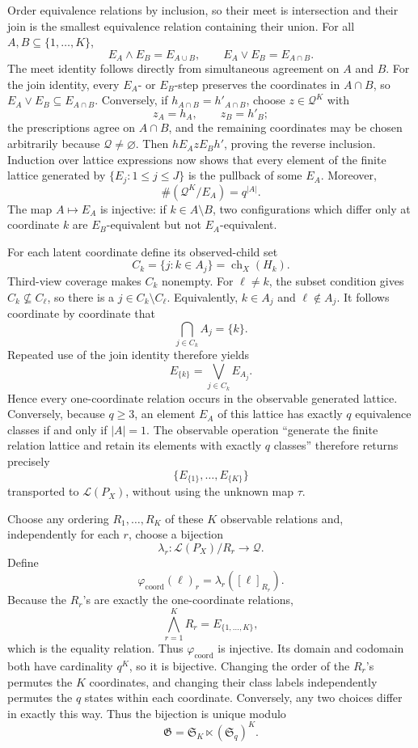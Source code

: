 Order equivalence relations by inclusion, so their meet is intersection and their join is the smallest equivalence relation containing their union.  For all \(A,B\subseteq\{1,\ldots,K\}\),
\[
 E_A\wedge E_B=E_{A\cup B},
 \qquad
 E_A\vee E_B=E_{A\cap B}.
\]
The meet identity follows directly from simultaneous agreement on \(A\) and \(B\).  For the join identity, every \(E_A\)- or \(E_B\)-step preserves the coordinates in \(A\cap B\), so \(E_A\vee E_B\subseteq E_{A\cap B}\).  Conversely, if \(h_{A\cap B}=h'_{A\cap B}\), choose \(z\in\mathcal Q^K\) with
\[
 z_A=h_A,
 \qquad z_B=h'_B;
\]
the prescriptions agree on \(A\cap B\), and the remaining coordinates may be chosen arbitrarily because \(\mathcal Q\ne\varnothing\).  Then \(h\mathrel{E_A}z\mathrel{E_B}h'\), proving the reverse inclusion.  Induction over lattice expressions now shows that every element of the finite lattice generated by \(\{E_j:1\le j\le J\}\) is the pullback of some \(E_A\).  Moreover,
\[
 \#(\mathcal Q^K/E_A)=q^{|A|}.
\]
The map \(A\mapsto E_A\) is injective: if \(k\in A\setminus B\), two configurations which differ only at coordinate \(k\) are \(E_B\)-equivalent but not \(E_A\)-equivalent.

For each latent coordinate define its observed-child set
\[
 C_k=\{j:k\in A_j\}=\operatorname{ch}_X(H_k).
\]
Third-view coverage makes \(C_k\) nonempty.  For \(\ell\ne k\), the subset condition gives \(C_k\nsubseteq C_\ell\), so there is a \(j\in C_k\setminus C_\ell\).  Equivalently, \(k\in A_j\) and \(\ell\notin A_j\).  It follows coordinate by coordinate that
\[
 \bigcap_{j\in C_k}A_j=\{k\}.
\]
Repeated use of the join identity therefore yields
\[
 E_{\{k\}}=\bigvee_{j\in C_k}E_{A_j}.
\]
Hence every one-coordinate relation occurs in the observable generated lattice.  Conversely, because \(q\ge3\), an element \(E_A\) of this lattice has exactly \(q\) equivalence classes if and only if \(|A|=1\).  The observable operation ``generate the finite relation lattice and retain its elements with exactly \(q\) classes'' therefore returns precisely
\[
 \{E_{\{1\}},\ldots,E_{\{K\}}\}
\]
transported to \(\mathscr L(P_X)\), without using the unknown map \(\tau\).

Choose any ordering \(R_1,\ldots,R_K\) of these \(K\) observable relations and, independently for each \(r\), choose a bijection
\[
 \lambda_r:\mathscr L(P_X)/R_r\longrightarrow\mathcal Q.
\]
Define
\[
 \varphi_{\mathrm{coord}}(\ell)_r
 =\lambda_r\!\left([\ell]_{R_r}\right).
\]
Because the \(R_r\)'s are exactly the one-coordinate relations,
\[
 \bigwedge_{r=1}^KR_r=E_{\{1,\ldots,K\}},
\]
which is the equality relation.  Thus \(\varphi_{\mathrm{coord}}\) is injective.  Its domain and codomain both have cardinality \(q^K\), so it is bijective.  Changing the order of the \(R_r\)'s permutes the \(K\) coordinates, and changing their class labels independently permutes the \(q\) states within each coordinate.  Conversely, any two choices differ in exactly this way.  Thus the bijection is unique modulo
\[
 \mathfrak G=\mathfrak S_K\ltimes(\mathfrak S_q)^K.
\]

